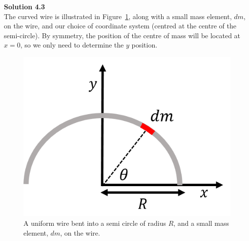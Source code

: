 \documentclass[9pt,arxiv,red]{lapreprint}
\begin{document}
\begin{framed}
\textbf{Solution 4.3}\\
The curved wire is illustrated in Figure~\ref{fig:momentumandcm:curvedwire}, along with a small mass element, $dm$, on the wire, and our choice of coordinate system (centred at the centre of the semi-circle). By symmetry, the position of the centre of mass will be located at $x=0$, so we only need to determine the $y$ position.

\begin{figure}[!htbp]
\centering
\includegraphics[width=0.4\linewidth]{files/curvedwire-99d938f2b3157166a4be5707dd9ea5b3.png}
\caption[]{A uniform wire bent into a semi circle of radius $R$, and a small mass element, $dm$, on the wire.}
\label{fig:momentumandcm:curvedwire}
\end{figure}


\end{framed}
\end{document}
